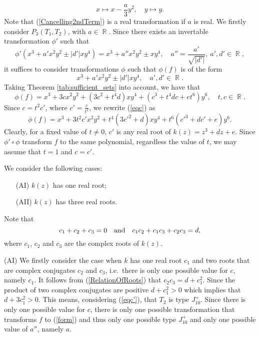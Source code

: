 \documentclass[noend]{amsproc}
\theoremstyle{definition}
\DeclareMathOperator{\R}{\mathbb{R}}
\begin{document}
\begin{equation}\label{Cancelling2ndTerm}
x\mapsto x-\frac{a}{3}y^2,\quad y\mapsto y.
\end{equation}
Note that (\ref{Cancelling2ndTerm}) is a real transformation if $a$ is real.
We firstly consider $P_3(T_1,T_2)$, with $a\in\R$. Since there exists an
invertable transformation $\phi'$ such that
\begin{equation}\label{phi'}
\phi'(x^3+a'x^2y^2\pm |d'|xy^4)=x^3+a''x^2y^2\pm xy^4,\quad
a''=\frac{a'}{\sqrt{|d'|}},\ a',d'\in \R,
\end{equation}
it suffices to consider transformations $\phi$ such that $\phi(f)$ is of the
form
\begin{equation}\label{form}
x^3+a'x^2y^2\pm |d'|xy^4,\quad a',d'\in \R.
\end{equation}
Taking Theorem \ref{tab:sufficient_sets} into account, we have that
\begin{equation}\label{eqc}
\phi(f)=x^3+3cx^2y^2+(3c^2+t^4d)xy^4+(c^3+t^4dc+et^6)y^6,\quad t,c\in\R.
\end{equation}
Since $c=t^2c'$, where $c'=\frac{c}{t^2}$, we rewrite (\ref{eqc}) as
\begin{equation}\label{eqc'}
\phi(f)=x^3+3t^2c'x^2y^2+t^4(3c'^2+d)xy^4+t^6(c'^3+dc'+e)y^6.
\end{equation}
Clearly, for a fixed value of $t\neq 0$, $c'$ is any real root of
$k(z)=z^3+dz+e$. Since $\phi'\circ\phi$ transform $f$ to the same polynomial,
regardless the value of $t$, we may assume that $t=1$ and $c=c'$.

We consider the following cases:
\begin{itemize}
\item[(AI)]$k(z)$ has one real root;
\item[(AII)]$k(z)$ has three real roots.
\end{itemize}

Note that
\begin{equation}\label{RelationOfRoots}
c_1+c_2+c_3=0\quad\textnormal{and}\quad c_1c_2+c_1c_3+c_2c_3=d,
\end{equation}
where $c_1$, $c_2$ and $c_3$ are the complex roots of $k(z)$.

(AI) We firstly consider the case when $k$ has one real root $c_1$ and two
roots that are complex conjugates $c_2$ and $c_3$, i.e.~there is only one
possible value for $c$, namely $c_1$. It follows from (\ref{RelationOfRoots})
that $c_2c_3=d+c_1^2$. Since the product of two complex conjugates are positive
$d+c_1^2>0$ which implies that $d+3c_1^2>0$. This means, considering
(\ref{eqc'}), that $T_2$ is type $J_{10}^+$. Since there is only one possible
value for $c$, there is only one possible transformation that transforms $f$ to
(\ref{form}) and thus only one possible type $J_{10}^+$ and only one possible
value of $a''$, namely $a$.
\end{document}
